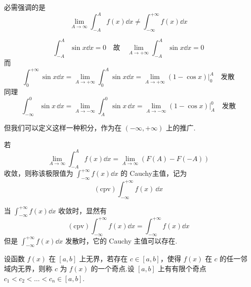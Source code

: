 必需强调的是
\[
\lim_{A\to\infty} \int_{-A}^A f(x)\dd x \neq \int_{-\infty}^{+\infty} f(x)\dd x
\]
\begin{example}
	\[
	\int_{-A}^A \sin x \dd x  = 0 \quad \text{故} \quad \lim_{A \to +\infty} \int_{-A}^A \sin x \dd x = 0
	\]
	而
	\[
	\int_0^{+\infty} \sin x \dd x = \lim_{A \to +\infty} \int_0^A \sin x \dd x = \lim_{A \to +\infty} \left. (1 - \cos x) \right|_0^A \quad \text{发散}
	\]
	同理
	\[
	\int_{-\infty}^0 \sin x \, \dd x = \lim_{A \to -\infty} \int_A^0 \sin x \, \dd x = \lim_{A \to -\infty} \left. (1 - \cos x) \right|_A^0 \quad \text{发散}
	\]
	
\end{example}


但我们可以定义这样一种积分，作为在 $(-\infty,+\infty)$ 上的推广.
\begin{definition}
	若
	\[
	\lim_{A \to \infty} \int_{-A}^A f(x) \dd x = \lim_{A \to \infty} \left( F(A) - F(-A) \right)
	\]
	收敛，则称该极限值为 $\displaystyle\int_{-\infty}^{+\infty} f(x)\dd x$ 的 Cauchy主值，记为
	\[
	(\text{cpv}) \int_{-\infty}^{+\infty} f(x) \, \dd x
	\]
	
	当 $\displaystyle\int_{-\infty}^{+\infty} f(x) \dd x$ 收敛时，显然有
	\[
	(\text{cpv}) \int_{-\infty}^{+\infty} f(x) \dd x = \int_{-\infty}^{+\infty} f(x) \dd x
	\]
	但是 $\displaystyle\int_{-\infty}^{+\infty} f(x) \dd x$ 发散时，它的 Cauchy 主值可以存在.
	
\end{definition}
设函数 $f(x)$ 在 $[a,b]$ 上无界，若存在 $c \in [a,b]$，使得 $f(x)$ 在 $c$ 的任一邻域内无界，则称 $c$ 为 $f(x)$ 的一个奇点.设 $[a,b]$ 上有有限个奇点 $c_1 < c_2 < \dots < c_n\in [a,b]$.

